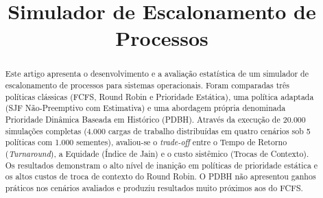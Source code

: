 \documentclass[conference]{IEEEtran}
\begin{document}
\title{Simulador de Escalonamento de Processos}

\author{
\and
{}
\and
{}
\and
{}
\and
{}
\and
{}
\and
{}
}

\maketitle

\begin{abstract}
Este artigo apresenta o desenvolvimento e a avaliação estatística de um simulador de escalonamento de processos para sistemas operacionais. Foram comparadas três políticas clássicas (FCFS, Round Robin e Prioridade Estática), uma política adaptada (SJF Não-Preemptivo com Estimativa) e uma abordagem própria denominada Prioridade Dinâmica Baseada em Histórico (PDBH). Através da execução de 20.000 simulações completas (4.000 cargas de trabalho distribuídas em quatro cenários sob 5 políticas com 1.000 sementes), avaliou-se o \textit{trade-off} entre o Tempo de Retorno (\textit{Turnaround}), a Equidade (Índice de Jain) e o custo sistêmico (Trocas de Contexto). Os resultados demonstram o alto nível de inanição em políticas de prioridade estática e os altos custos de troca de contexto do Round Robin. O PDBH não apresentou ganhos práticos nos cenários avaliados e produziu resultados muito próximos aos do FCFS.
\end{abstract}
\end{document}
